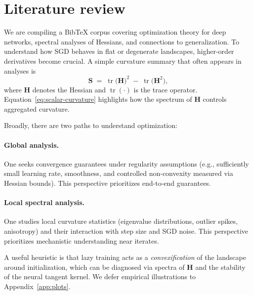 \documentclass[12pt]{article}
\begin{document}
\section{Literature review}\label{sec:lit}
We are compiling a BibTeX corpus covering optimization theory for deep networks, spectral analyses of Hessians, and connections to generalization. To understand how SGD behaves in flat or degenerate landscapes, higher-order derivatives become crucial. A simple curvature summary that often appears in analyses is
\begin{equation}\label{eq:scalar-curvature}
\bm{S} \;=\; \operatorname{tr}\!\big(\bm{H}\big)^{2} \;-\; \operatorname{tr}\!\big(\bm{H}^{2}\big),
\end{equation}
where \(\bm{H}\) denotes the Hessian and \(\operatorname{tr}(\cdot)\) is the trace operator. Equation~\eqref{eq:scalar-curvature} highlights how the spectrum of \(\bm{H}\) controls aggregated curvature.

Broadly, there are two paths to understand optimization:
\paragraph{Global analysis.} One seeks convergence guarantees under regularity assumptions (e.g., sufficiently small learning rate, smoothness, and controlled non-convexity measured via Hessian bounds). This perspective prioritizes end-to-end guarantees.
\paragraph{Local spectral analysis.} One studies local curvature statistics (eigenvalue distributions, outlier spikes, anisotropy) and their interaction with step size and SGD noise. This perspective prioritizes mechanistic understanding near iterates.

A useful heuristic is that lazy training acts as a \emph{convexification} of the landscape around initialization, which can be diagnosed via spectra of \(\bm{H}\) and the stability of the neural tangent kernel. We defer empirical illustrations to Appendix~\ref{app:plots}.
\end{document}
